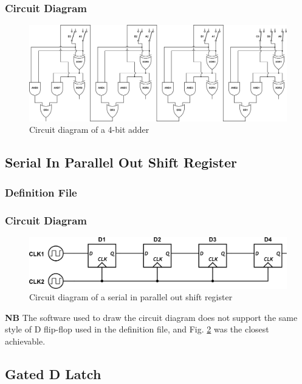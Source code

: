 \documentclass[a4paper,10pt]{article}
\begin{document}
\subsubsection{Circuit Diagram}
\begin{figure}[h]
 \centering
 \includegraphics[width=14cm]{../../examples/4-bit-adder.png}
 \caption{Circuit diagram of a 4-bit adder}
 \label{fig:example-adder}
\end{figure}

\subsection{Serial In Parallel Out Shift Register}

\subsubsection{Definition File}


\subsubsection{Circuit Diagram}
\begin{figure}[h]
 \centering
 \includegraphics[width=12cm]{../../examples/sipo.png}
 \caption{Circuit diagram of a serial in parallel out shift register}
 \label{fig:example-sipo}
\end{figure}

\textbf{NB} The software used to draw the circuit diagram does not support the same style of D flip-flop used in the definition file, and Fig. \ref{fig:example-sipo} was the closest achievable.

\subsection{Gated D Latch}
\end{document}
